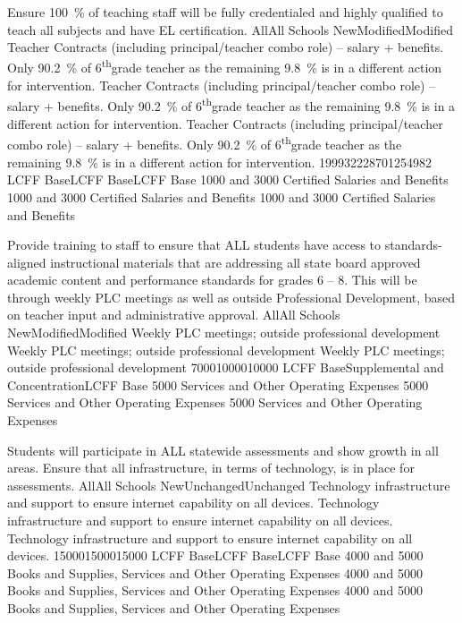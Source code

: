 \documentclass{article}
\renewcommand{\th}{\textsuperscript{th}}
\newcounter{goal}[section] %
\newcounter{action}[goal]
\begin{document}
\begin{planactions}
	\planaction
	{Ensure \SI{100}{\percent} of teaching staff will be fully credentialed and highly qualified to teach all subjects and have EL certification.}
	\planaction@scope
	{All}{All Schools}
	\planaction@action
	{New}{Modified}{Modified}
	{Teacher Contracts (including principal/teacher combo role) -- salary + benefits. Only \SI{90.2}{\percent} of 6\th grade teacher as the remaining \SI{9.8}{\percent} is in a different action for intervention.}
	{Teacher Contracts (including principal/teacher combo role) -- salary + benefits. Only \SI{90.2}{\percent} of 6\th grade teacher as the remaining \SI{9.8}{\percent} is in a different action for intervention.}
	{Teacher Contracts (including principal/teacher combo role) -- salary + benefits. Only \SI{90.2}{\percent} of 6\th grade teacher as the remaining \SI{9.8}{\percent} is in a different action for intervention.}
	\planaction@budget
	{199932}{228701}{254982}
	{LCFF Base}{LCFF Base}{LCFF Base}
	{\num{1000} and \num{3000} Certified Salaries and Benefits}
	{\num{1000} and \num{3000} Certified Salaries and Benefits}
	{\num{1000} and \num{3000} Certified Salaries and Benefits}

	\planaction
	{Provide training to staff to ensure that ALL students have access to standards-aligned instructional materials that are addressing all state board approved academic content and performance standards for grades 6 -- 8. This will be through weekly PLC meetings as well as outside Professional Development, based on teacher input and administrative approval.}
	\planaction@scope
	{All}{All Schools}
	\planaction@action
	{New}{Modified}{Modified}
	{Weekly PLC meetings; outside professional development}
	{Weekly PLC meetings; outside professional development}
	{Weekly PLC meetings; outside professional development}
	\planaction@budget
	{7000}{10000}{10000}
	{LCFF Base}{Supplemental and Concentration}{LCFF Base}
	{\num{5000} Services and Other Operating Expenses}
	{\num{5000} Services and Other Operating Expenses}
	{\num{5000} Services and Other Operating Expenses}
	
	\planaction
	{Students will participate in ALL statewide assessments and show growth in all areas. Ensure that all infrastructure, in terms of technology, is in place for assessments.}
	\planaction@scope
	{All}{All Schools}
	\planaction@action
	{New}{Unchanged}{Unchanged}
	{Technology infrastructure and support to ensure internet capability on all devices.}
	{Technology infrastructure and support to ensure internet capability on all devices.}
	{Technology infrastructure and support to ensure internet capability on all devices.}
	\planaction@budget
	{15000}{15000}{15000}
	{LCFF Base}{LCFF Base}{LCFF Base}
	{\num{4000} and \num{5000} Books and Supplies, Services and Other Operating Expenses}
	{\num{4000} and \num{5000} Books and Supplies, Services and Other Operating Expenses}
	{\num{4000} and \num{5000} Books and Supplies, Services and Other Operating Expenses}


\end{planactions}
\end{document}
